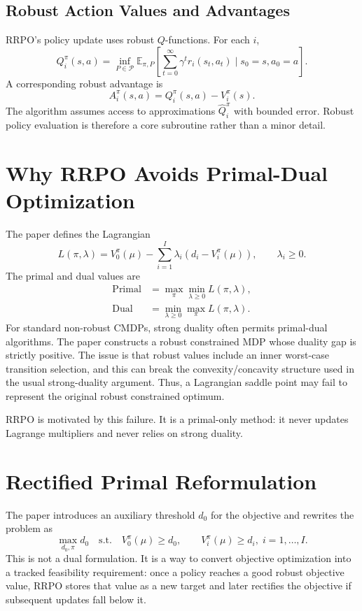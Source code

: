\documentclass[11pt]{article}
\newcommand{\Pset}{\mathcal P}
\newcommand{\E}{\mathbb E}
\newcommand{\1}{\mathbf 1}
\begin{document}
\subsection{Robust Action Values and Advantages}
RRPO's policy update uses robust $Q$-functions.  For each $i$,
\begin{equation}
    Q_i^\pi(s,a)
    =\inf_{P\in\Pset}\E_{\pi,P}\!\left[\sum_{t=0}^{\infty}\gamma^t r_i(s_t,a_t)\mid s_0=s,a_0=a\right].
\end{equation}
A corresponding robust advantage is
\begin{equation}
    A_i^\pi(s,a)=Q_i^\pi(s,a)-V_i^\pi(s).
\end{equation}
The algorithm assumes access to approximations $\widehat Q_i^\pi$ with bounded error.  Robust policy evaluation is therefore a core subroutine rather than a minor detail.

\section{Why RRPO Avoids Primal-Dual Optimization}
The paper defines the Lagrangian
\begin{equation}
    L(\pi,\lambda)=V_0^\pi(\mu)-\sum_{i=1}^{I}\lambda_i(d_i-V_i^\pi(\mu)),
    \qquad \lambda_i\ge0.
\end{equation}
The primal and dual values are
\begin{align}
    \text{Primal} &= \max_\pi\min_{\lambda\ge0}L(\pi,\lambda),\\
    \text{Dual} &= \min_{\lambda\ge0}\max_\pi L(\pi,\lambda).
\end{align}
For standard non-robust CMDPs, strong duality often permits primal-dual algorithms.  The paper constructs a robust constrained MDP whose duality gap is strictly positive.  The issue is that robust values include an inner worst-case transition selection, and this can break the convexity/concavity structure used in the usual strong-duality argument.  Thus, a Lagrangian saddle point may fail to represent the original robust constrained optimum.

RRPO is motivated by this failure.  It is a primal-only method: it never updates Lagrange multipliers and never relies on strong duality.

\section{Rectified Primal Reformulation}
The paper introduces an auxiliary threshold $d_0$ for the objective and rewrites the problem as
\begin{equation}
    \max_{d_0,\pi} d_0
    \quad\text{s.t.}\quad
    V_0^\pi(\mu)\ge d_0,
    \qquad
    V_i^\pi(\mu)\ge d_i,
    \; i=1,\ldots,I.
    \label{eq:epigraph-like-rrpo}
\end{equation}
This is not a dual formulation.  It is a way to convert objective optimization into a tracked feasibility requirement: once a policy reaches a good robust objective value, RRPO stores that value as a new target and later rectifies the objective if subsequent updates fall below it.
\end{document}
